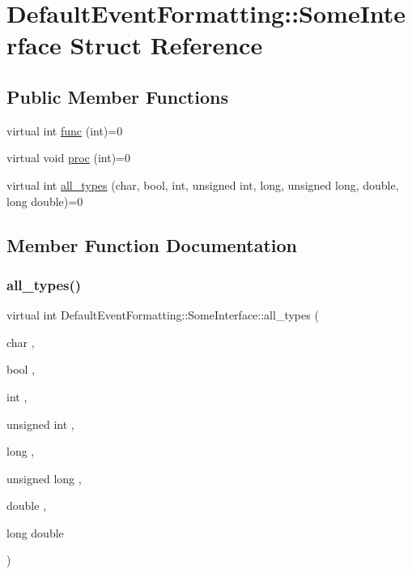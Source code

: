\hypertarget{structDefaultEventFormatting_1_1SomeInterface}{}\section{Default\+Event\+Formatting\+::Some\+Interface Struct Reference}
\label{structDefaultEventFormatting_1_1SomeInterface}
\subsection*{Public Member Functions}
\begin{DoxyCompactItemize}
\item 
virtual int \mbox{\hyperlink{structDefaultEventFormatting_1_1SomeInterface_a5ce21d5ec7b6de8a42f6d083f1121a2c}{func}} (int)=0
\item 
virtual void \mbox{\hyperlink{structDefaultEventFormatting_1_1SomeInterface_adcb4cefc5e23428442115827ebd39323}{proc}} (int)=0
\item 
virtual int \mbox{\hyperlink{structDefaultEventFormatting_1_1SomeInterface_a3fdbc8d8825ac8d717f027c2796468a8}{all\+\_\+types}} (char, bool, int, unsigned int, long, unsigned long, double, long double)=0
\end{DoxyCompactItemize}


\subsection{Member Function Documentation}
\mbox{\label{structDefaultEventFormatting_1_1SomeInterface_a3fdbc8d8825ac8d717f027c2796468a8}} 
\subsubsection{\texorpdfstring{all\_types()}{all\_types()}}
{\footnotesize\ttfamily virtual int Default\+Event\+Formatting\+::\+Some\+Interface\+::all\+\_\+types (\begin{DoxyParamCaption}\item[{char}]{,  }\item[{bool}]{,  }\item[{int}]{,  }\item[{unsigned int}]{,  }\item[{long}]{,  }\item[{unsigned long}]{,  }\item[{double}]{,  }\item[{long double}]{ }\end{DoxyParamCaption})\hspace{0.3cm}{\ttfamily [pure virtual]}}

